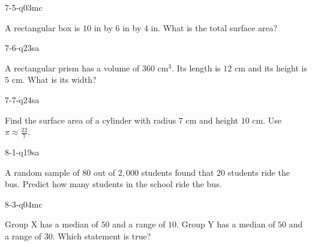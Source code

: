 \begin{practiceQuestion}{7-5-q03}{mc}
\begin{questionText}
A rectangular box is $10$ in by $6$ in by $4$ in. What is the total surface area?
\end{questionText}
\end{practiceQuestion}

\begin{practiceQuestion}{7-6-q23}{sa}
\begin{questionText}
A rectangular prism has a volume of $360$ cm$^3$. Its length is $12$ cm and its height is $5$ cm. What is its width?
\end{questionText}
\end{practiceQuestion}

\begin{practiceQuestion}{7-7-q24}{sa}
\begin{questionText}
Find the surface area of a cylinder with radius $7$ cm and height $10$ cm. Use $\pi \approx \frac{22}{7}$.
\end{questionText}
\end{practiceQuestion}

\begin{practiceQuestion}{8-1-q19}{sa}
\begin{questionText}
A random sample of $80$ out of $2{,}000$ students found that $20$ students ride the bus. Predict how many students in the school ride the bus.
\end{questionText}
\end{practiceQuestion}

\begin{practiceQuestion}{8-3-q04}{mc}
\begin{questionText}
Group X has a median of $50$ and a range of $10$. Group Y has a median of $50$ and a range of $30$. Which statement is true?
\end{questionText}
\end{practiceQuestion}

